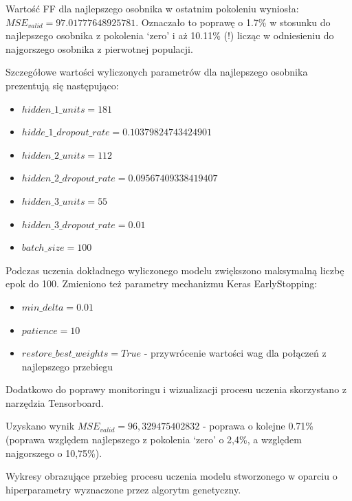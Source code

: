 \documentclass[a4paper,11pt]{article}
\begin{document}
    \bigskip

    Wartość FF dla najlepszego osobnika w ostatnim pokoleniu wyniosła: $MSE_{valid} = 97.01777648925781$. Oznaczało to poprawę o 1.7\% w stosunku do najlepszego osobnika z pokolenia `zero' i aż 10.11\% (!) licząc w odniesieniu do najgorszego osobnika z pierwotnej populacji.

    \bigskip

    Szczegółowe wartości wyliczonych parametrów dla najlepszego osobnika prezentują się następująco:
    \begin{itemize}
        \item $hidden\_1\_units = 181$
        \item $hidde\_1\_dropout\_rate = 0.10379824743424901$
        \item $hidden\_2\_units = 112$
        \item $hidden\_2\_dropout\_rate = 0.09567409338419407$
        \item $hidden\_3\_units = 55$
        \item $hidden\_3\_dropout\_rate = 0.01$
        \item $batch\_size = 100$
    \end{itemize}

    \bigskip

    Podczas uczenia dokładnego wyliczonego modelu zwiększono maksymalną liczbę epok do 100. Zmieniono też parametry mechanizmu Keras EarlyStopping:
    \begin{itemize}
        \item $min\_delta=0.01$
        \item $patience=10$
        \item $restore\_best\_weights=True$ - przywrócenie wartości wag dla połączeń z najlepszego przebiegu
    \end{itemize}

    \bigskip

    Dodatkowo do poprawy monitoringu i wizualizacji procesu uczenia skorzystano z narzędzia Tensorboard.

    \bigskip

    Uzyskano wynik $MSE_{valid} = 96,329475402832$ - poprawa o kolejne 0.71\% (poprawa względem najlepszego z pokolenia `zero' o 2,4\%, a względem najgorszego o 10,75\%).

    \bigskip

    Wykresy obrazujące przebieg procesu uczenia modelu stworzonego w oparciu o hiperparametry wyznaczone przez algorytm genetyczny.
\end{document}
